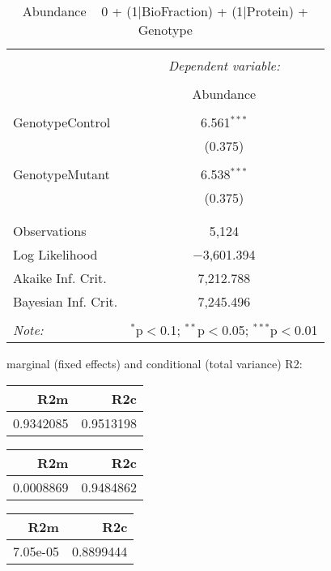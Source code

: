 \documentclass[11pt]{report}
\begin{document}
\begin{table}[!htbp] \centering 
  \caption{Abundance ~ 0 + (1|BioFraction) + (1|Protein) + Genotype} 
  \label{} 
\begin{tabular}{@{\extracolsep{5pt}}lc} 
\\[-1.8ex]\hline 
\hline \\[-1.8ex] 
 & \multicolumn{1}{c}{\textit{Dependent variable:}} \\ 
\cline{2-2} 
\\[-1.8ex] & Abundance \\ 
\hline \\[-1.8ex] 
 GenotypeControl & 6.561$^{***}$ \\ 
  & (0.375) \\ 
  & \\ 
 GenotypeMutant & 6.538$^{***}$ \\ 
  & (0.375) \\ 
  & \\ 
\hline \\[-1.8ex] 
Observations & 5,124 \\ 
Log Likelihood & $-$3,601.394 \\ 
Akaike Inf. Crit. & 7,212.788 \\ 
Bayesian Inf. Crit. & 7,245.496 \\ 
\hline 
\hline \\[-1.8ex] 
\textit{Note:}  & \multicolumn{1}{r}{$^{*}$p$<$0.1; $^{**}$p$<$0.05; $^{***}$p$<$0.01} \\ 
\end{tabular} 
\end{table} 
marginal (fixed effects) and conditional (total variance) R2:

\begin{tabular}{r|r}
\hline
R2m & R2c\\
\hline
0.9342085 & 0.9513198\\
\hline
\end{tabular}

\begin{tabular}{r|r}
\hline
R2m & R2c\\
\hline
0.0008869 & 0.9484862\\
\hline
\end{tabular}

\begin{tabular}{r|r}
\hline
R2m & R2c\\
\hline
7.05e-05 & 0.8899444\\
\hline
\end{tabular}
\end{document}

